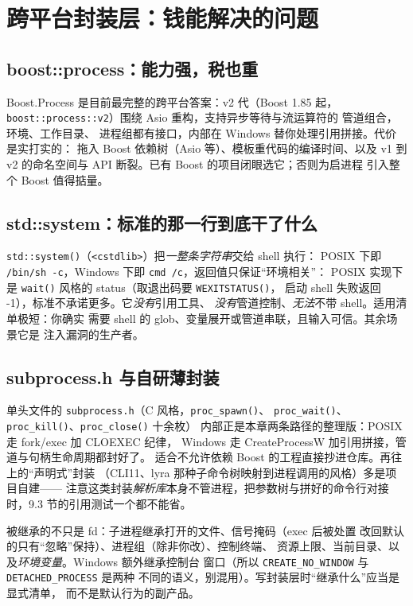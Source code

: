 \documentclass[12pt,a4paper,fontset=fandol]{ctexbook}
\newcommand{\Fn}[1]{\texttt{#1()}}
\newcommand{\Tp}[1]{\texttt{#1}}
\newcommand{\Bk}{\allowbreak}
\begin{document}
\section{跨平台封装层：钱能解决的问题}

\subsection{boost::process：能力强，税也重}

Boost.Process 是目前最完整的跨平台答案：v2 代（Boost 1.85 起，
\Tp{boost\Bk::process\Bk::v2}）围绕 Asio 重构，支持异步等待与流运算符的
管道组合，环境、工作目录、
进程组都有接口，内部在 Windows 替你处理引用拼接。代价是实打实的：
拖入 Boost 依赖树（Asio 等）、模板重代码的编译时间、以及 v1 到 v2
的命名空间与 API 断裂。已有 Boost 的项目闭眼选它；否则为启进程
引入整个 Boost 值得掂量。

\subsection{std::system：标准的那一行到底干了什么}

\Fn{std::system}（\Tp{<cstdlib>}）把\emph{一整条字符串}交给 shell 执行：
POSIX 下即 \Tp{/bin/sh -c}，Windows 下即 \Tp{cmd /c}，返回值只保证``环境相关''：
POSIX 实现下是 \Fn{wait} 风格的 status（取退出码要 \Fn{WEXITSTATUS}，
启动 shell 失败返回 -1），标准不承诺更多。它\emph{没有}引用工具、
\emph{没有}管道控制、\emph{无法}不带 shell。适用清单极短：你确实
需要 shell 的 glob、变量展开或管道串联，且输入可信。其余场景它是
注入漏洞的生产者。

\subsection{subprocess.h 与自研薄封装}

单头文件的 \Tp{subprocess.h}（C 风格，\Fn{proc\Bk\_spawn}、
\Fn{proc\Bk\_wait}、\Fn{proc\Bk\_kill}、\Fn{proc\Bk\_close} 十余枚）
内部正是本章两条路径的整理版：POSIX 走 fork/exec 加 CLOEXEC 纪律，
Windows 走 CreateProcessW 加引用拼接，管道与句柄生命周期都封好了。
适合不允许依赖 Boost 的工程直接抄进仓库。再往上的``声明式''封装
（CLI11、lyra 那种子命令树映射到进程调用的风格）多是项目自建——
注意这类封装\emph{解析库}本身不管进程，把参数树与拼好的命令行对接
时，9.3 节的引用测试一个都不能省。

\begin{note}[title={子进程继承了你的什么}]
被继承的不只是 fd：子进程继承打开的文件、信号掩码（exec 后被处置
改回默认的只有``忽略''保持）、进程组（除非你改）、控制终端、
资源上限、当前目录、以及\emph{环境变量}。Windows 额外继承控制台
窗口（所以 \Tp{CREATE\_NO\_WINDOW} 与 \Tp{DETACHED\_PROCESS} 是两种
不同的语义，别混用）。写封装层时``继承什么''应当是显式清单，
而不是默认行为的副产品。
\end{note}
\end{document}
